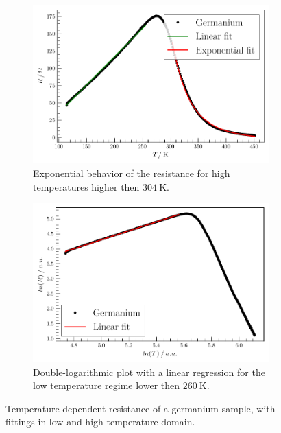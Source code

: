 \begin{figure}
    \centering
\begin{subfigure}{.45\textwidth}
    \centering
    \includegraphics[width=\textwidth]{plots/R1.pdf}
    \caption{Exponential behavior of the resistance for high temperatures higher then $\SI{304}{\kelvin}$.}
    \label{fig:Ge-exp}
\end{subfigure}
\begin{subfigure}{.45\textwidth}
    \centering
    \includegraphics[width=\textwidth]{plots/R1-log.pdf}
  \caption{Double-logarithmic plot with a linear regression for the low temperature regime lower then $\SI{260}{\kelvin}$.}
    \label{fig:Ge-log}
\end{subfigure}
\caption{Temperature-dependent resistance of a germanium sample, with fittings in low and high temperature domain.}
\label{fig:semiconductor-fit}
\end{figure}

